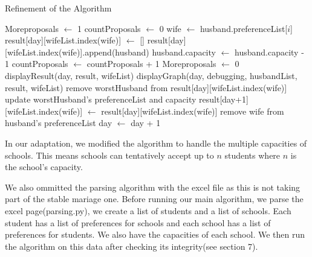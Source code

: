 \documentclass{article}
\begin{document}
\begin{algorithm}
    \caption{Refinement of the Algorithm}
    \begin{algorithmic}[1]
        \State Moreproposals $\gets$ 1
        \State countProposals $\gets$ 0
        \State wife $\gets$ husband.preferenceList[$i$]
        \State result[day][wifeList.index(wife)] $\gets$ []
        \EndIf
        \State result[day][wifeList.index(wife)].append(husband)
        \State husband.capacity $\gets$ husband.capacity - 1
        \State countProposals $\gets$ countProposals + 1
        \EndIf
        \EndFor
        \EndFor
        \State Moreproposals $\gets$ 0
        \State displayResult(day, result, wifeList)
        \State displayGraph(day, debugging, husbandList, result, wifeList)
        \Else
        \State remove worstHusband from result[day][wifeList.index(wife)]
        \State update worstHusband's preferenceList and capacity
        \EndWhile
        \State result[day+1][wifeList.index(wife)] $\gets$ result[day][wifeList.index(wife)]
        \State remove wife from husband's preferenceList
        \EndFor
        \EndIf
        \EndFor
        \EndIf
        \State day $\gets$ day + 1
        \EndWhile
    \end{algorithmic}
\end{algorithm}

In our adaptation, we modified the algorithm to handle the multiple capacities of schools. This means schools can tentatively accept up to \( n \) students where \( n \) is the school's capacity.

We also ommitted the parsing algorithm with the excel file as this is not taking part of the stable mariage one. Before running our main algorithm, we parse the excel page(parsing.py), we create a list of students and a list of schools. Each student has a list of preferences for schools and each school has a list of preferences for students. We also have the capacities of each school. We then run the algorithm on this data after checking its integrity(see section 7).
\end{document}
